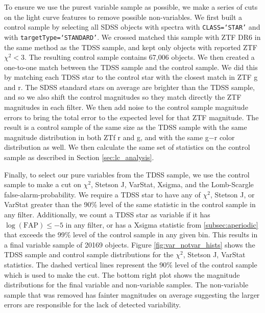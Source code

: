 \documentclass[twocolumn, tighten, astrosymb]{aastex631}
\begin{document}
To ensure we use the purest variable sample as possible, we make a series of cuts on the light curve features to remove possible non-variables. We first built a control sample by selecting all SDSS objects with spectra with \texttt{CLASS=`STAR'} and with \texttt{targetType=`STANDARD'}. We crossed matched this sample with ZTF DR6 in the same method as the TDSS sample, and kept only objects with reported ZTF $\chi^2 < 3$. The resulting control sample contains 67,006 objects. We then created a one-to-one match between the TDSS sample and the control sample. We did this by matching each TDSS star to the control star with the closest match in ZTF g and r. The SDSS standard stars on average are brighter than the TDSS sample, and so we also shift the control magnitudes so they match directly the ZTF magnitudes in each filter. We then add noise to the control sample magnitude errors to bring the total error to the expected level for that ZTF magnitude. The result is a control sample of the same size as the TDSS sample with the same magnitude distribution in both ZTf r and g, and with the same g$-$r color distribution as well. We then calculate the same set of statistics on the control sample as described in Section \ref{sec:lc_analysis}.

Finally, to select our pure variables from the TDSS sample, we use the control sample to make a cut on $\chi^2$, Stetson J, VarStat, Xsigma, and the Lomb-Scargle false-alarm-probability. We require a TDSS star to have any of $\chi^2$, Stetson J, or VarStat greater than the 90\% level of the same statistic in the control sample in any filter. Additionally, we count a TDSS star as variable if it has $\log{(\textrm{FAP})} \leq -5$ in any filter, or has a Xsigma statistic from \ref{subsec:aperiodic} that exceeds the 99\% level of the control sample in any given bin. This results in a final variable sample of 20169 objects. Figure \ref{fig:var_notvar_hists} shows the TDSS sample and control sample distributions for the $\chi^2$, Stetson J, VarStat statistics. The dashed vertical lines represent the 90\% level of the control sample which is used to make the cut. The bottom right plot shows the magnitude distributions for the final variable and non-variable samples. The non-variable sample that was removed has fainter magnitudes on average suggesting the larger errors are responsible for the lack of detected variability.

\begin{figure*}
\centering
\caption{need to add caption here}
\label{fig:var_notvar_hists}
\end{figure*}
\end{document}
